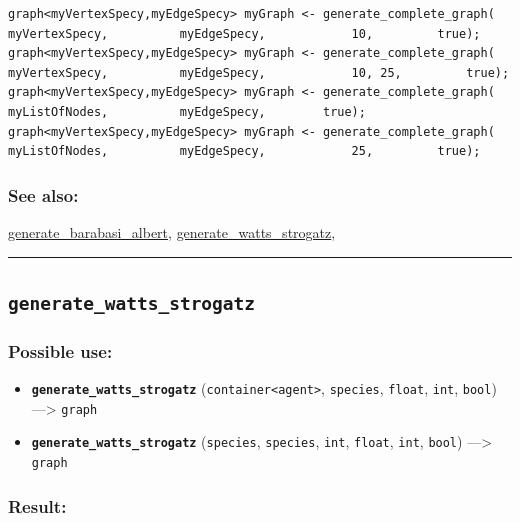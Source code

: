 \documentclass[]{book}
\providecommand{\tightlist}{%
  \setlength{\itemsep}{0pt}\setlength{\parskip}{0pt}}
\theoremstyle{definition}
\theoremstyle{definition}
\theoremstyle{definition}
\theoremstyle{remark}
\begin{document}
\begin{verbatim}
graph<myVertexSpecy,myEdgeSpecy> myGraph <- generate_complete_graph(            myVertexSpecy,          myEdgeSpecy,            10,         true); graph<myVertexSpecy,myEdgeSpecy> myGraph <- generate_complete_graph(             myVertexSpecy,          myEdgeSpecy,            10, 25,         true); graph<myVertexSpecy,myEdgeSpecy> myGraph <- generate_complete_graph(             myListOfNodes,          myEdgeSpecy,        true); graph<myVertexSpecy,myEdgeSpecy> myGraph <- generate_complete_graph(             myListOfNodes,          myEdgeSpecy,            25,         true); 
\end{verbatim}

\subsubsection{See also:}\label{see-also-104}

\href{operators-d-to-h.html\#generate_barabasi_albert}{generate\_barabasi\_albert},
\href{operators-d-to-h.html\#generate_watts_strogatz}{generate\_watts\_strogatz},

\begin{center}\rule{0.5\linewidth}{\linethickness}\end{center}

\subsection{\texorpdfstring{\texttt{generate\_watts\_strogatz}}{generate\_watts\_strogatz}}\label{generate_watts_strogatz}

\subsubsection{Possible use:}\label{possible-use-188}

\begin{itemize}
\tightlist
\item
  \textbf{\texttt{generate\_watts\_strogatz}}
  (\texttt{container\textless{}agent\textgreater{}}, \texttt{species},
  \texttt{float}, \texttt{int}, \texttt{bool}) ---\textgreater{}
  \texttt{graph}
\item
  \textbf{\texttt{generate\_watts\_strogatz}} (\texttt{species},
  \texttt{species}, \texttt{int}, \texttt{float}, \texttt{int},
  \texttt{bool}) ---\textgreater{} \texttt{graph}
\end{itemize}

\subsubsection{Result:}\label{result-182}
\end{document}

